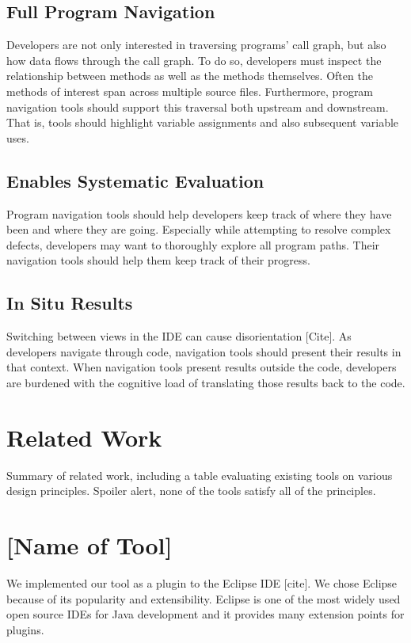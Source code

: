 \documentclass[conference]{IEEEtran}
\begin{document}
\subsection{Full Program Navigation}
Developers are not only interested in traversing programs' call graph, but also how data flows through the call graph.
To do so, developers must inspect the relationship between methods as well as the methods themselves.
Often the methods of interest span across multiple source files.
Furthermore, program navigation tools should support this traversal both upstream and downstream. 
That is, tools should highlight variable assignments and also subsequent variable uses. 

\subsection{Enables Systematic Evaluation}
Program navigation tools should help developers keep track of where they have been and where they are going. Especially while attempting to resolve complex defects, developers may want to thoroughly explore all program paths. Their navigation tools should help them keep track of their progress.

\subsection{In Situ Results}  
Switching between views in the IDE can cause disorientation [Cite]. As developers navigate through code, navigation tools should present their results in that context. 
When navigation tools present results outside the code, developers are burdened with the cognitive load of translating those results back to the code.

\section{Related Work}
Summary of related work, including a table evaluating existing tools on various design principles.
Spoiler alert, none of the tools satisfy all of the principles.


\section{[Name of Tool]}
We implemented our tool as a plugin to the Eclipse IDE [cite]. We chose Eclipse because of its popularity and extensibility. 
Eclipse is one of the most widely used open source IDEs for Java development and it provides many extension points for plugins. 
\end{document}
